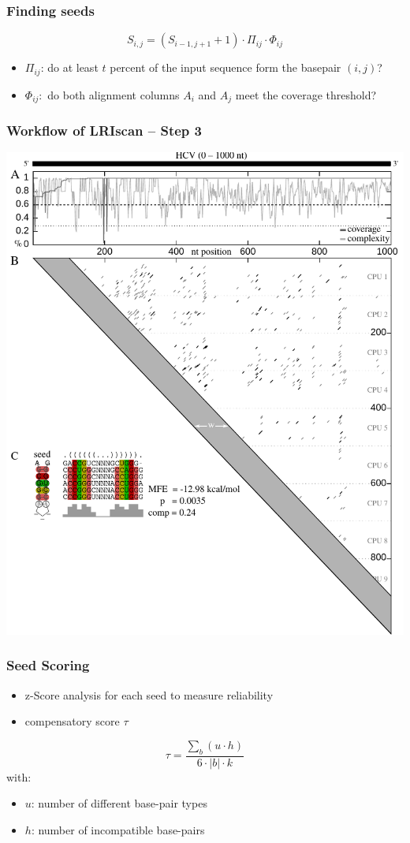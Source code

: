 \begin{frame}[c]\frametitle{Finding seeds}
	\[
		S_{i,j} = (S_{i-1,j+1} + 1) \cdot \Pi_{ij} \cdot \Phi_{ij}
	\]
	\begin{itemize}
		\item $\Pi_{ij}$: do at least $t$ percent of the input sequence form the basepair $(i,j)$?
		\item $\Phi_{ij}:$ do both alignment columns $A_i$ and $A_j$ meet the coverage threshold?
	\end{itemize}
\end{frame}


\begin{frame}[c]\frametitle{Workflow of LRIscan -- Step 3}
	\begin{center}
		\includegraphics[height=0.9\textheight]{figures/lri_workflow_3.pdf}
	\end{center}
\end{frame}

\begin{frame}[c]\frametitle{Seed Scoring}
	\begin{itemize}
		\item z-Score analysis for each seed to measure reliability
		\item compensatory score $\tau$
	\end{itemize}
	\[
		\tau = \frac{\sum_b(u\cdot h)}{6\cdot \lvert b\rvert\cdot k}
	\]
	with:
	\begin{itemize}
		\item $u$: number of different base-pair types
		\item $h$: number of incompatible base-pairs 
	\end{itemize}
\end{frame}

